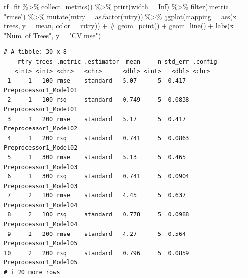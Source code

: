 \documentclass[
]{article}
\newenvironment{Shaded}{\begin{snugshade}}{\end{snugshade}}
\newcommand{\AttributeTok}[1]{\textcolor[rgb]{0.40,0.45,0.13}{#1}}
\newcommand{\CommentTok}[1]{\textcolor[rgb]{0.37,0.37,0.37}{#1}}
\newcommand{\ConstantTok}[1]{\textcolor[rgb]{0.56,0.35,0.01}{#1}}
\newcommand{\FunctionTok}[1]{\textcolor[rgb]{0.28,0.35,0.67}{#1}}
\newcommand{\NormalTok}[1]{\textcolor[rgb]{0.00,0.23,0.31}{#1}}
\newcommand{\SpecialCharTok}[1]{\textcolor[rgb]{0.37,0.37,0.37}{#1}}
\newcommand{\StringTok}[1]{\textcolor[rgb]{0.13,0.47,0.30}{#1}}
\begin{document}
\begin{Shaded}
\begin{Highlighting}[]
\NormalTok{rf\_fit }\SpecialCharTok{\%\textgreater{}\%}
  \FunctionTok{collect\_metrics}\NormalTok{() }\SpecialCharTok{\%\textgreater{}\%}
  \FunctionTok{print}\NormalTok{(}\AttributeTok{width =} \ConstantTok{Inf}\NormalTok{) }\SpecialCharTok{\%\textgreater{}\%}
  \FunctionTok{filter}\NormalTok{(.metric }\SpecialCharTok{==} \StringTok{"rmse"}\NormalTok{) }\SpecialCharTok{\%\textgreater{}\%}
  \FunctionTok{mutate}\NormalTok{(}\AttributeTok{mtry =} \FunctionTok{as.factor}\NormalTok{(mtry)) }\SpecialCharTok{\%\textgreater{}\%}
  \FunctionTok{ggplot}\NormalTok{(}\AttributeTok{mapping =} \FunctionTok{aes}\NormalTok{(}\AttributeTok{x =}\NormalTok{ trees, }\AttributeTok{y =}\NormalTok{ mean, }\AttributeTok{color =}\NormalTok{ mtry)) }\SpecialCharTok{+}
  \CommentTok{\# geom\_point() + }
  \FunctionTok{geom\_line}\NormalTok{() }\SpecialCharTok{+} 
  \FunctionTok{labs}\NormalTok{(}\AttributeTok{x =} \StringTok{"Num. of Trees"}\NormalTok{, }\AttributeTok{y =} \StringTok{"CV mse"}\NormalTok{)}
\end{Highlighting}
\end{Shaded}

\begin{verbatim}
# A tibble: 30 x 8
    mtry trees .metric .estimator  mean     n std_err .config              
   <int> <int> <chr>   <chr>      <dbl> <int>   <dbl> <chr>                
 1     1   100 rmse    standard   5.07      5  0.417  Preprocessor1_Model01
 2     1   100 rsq     standard   0.749     5  0.0838 Preprocessor1_Model01
 3     1   200 rmse    standard   5.17      5  0.417  Preprocessor1_Model02
 4     1   200 rsq     standard   0.741     5  0.0863 Preprocessor1_Model02
 5     1   300 rmse    standard   5.13      5  0.465  Preprocessor1_Model03
 6     1   300 rsq     standard   0.741     5  0.0904 Preprocessor1_Model03
 7     2   100 rmse    standard   4.45      5  0.637  Preprocessor1_Model04
 8     2   100 rsq     standard   0.778     5  0.0988 Preprocessor1_Model04
 9     2   200 rmse    standard   4.27      5  0.564  Preprocessor1_Model05
10     2   200 rsq     standard   0.796     5  0.0859 Preprocessor1_Model05
# i 20 more rows
\end{verbatim}
\end{document}
